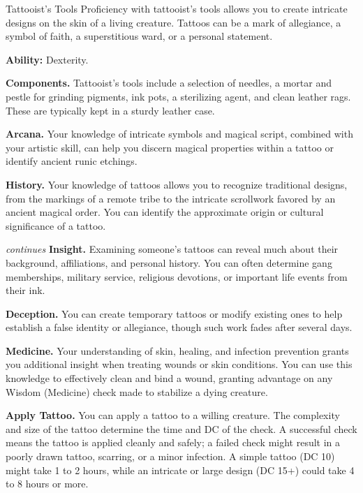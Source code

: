 \begin{Card}{Tattooist's Tools}
Proficiency with tattooist's tools allows you to create intricate designs on the skin of a living creature. Tattoos can be a mark of allegiance, a symbol of faith, a superstitious ward, or a personal statement.

\textbf{Ability:} Dexterity.

\textbf{Components.} Tattooist's tools include a selection of needles, a mortar and pestle for grinding pigments, ink pots, a sterilizing agent, and clean leather rags. These are typically kept in a sturdy leather case.

\textbf{Arcana.} Your knowledge of intricate symbols and magical script, combined with your artistic skill, can help you discern magical properties within a tattoo or identify ancient runic etchings.

\textbf{History.} Your knowledge of tattoos allows you to recognize traditional designs, from the markings of a remote tribe to the intricate scrollwork favored by an ancient magical order. You can identify the approximate origin or cultural significance of a tattoo.

\vfill \hfill \textit{\footnotesize continues}
\newpage
{}
\textbf{Insight.} Examining someone's tattoos can reveal much about their background, affiliations, and personal history. You can often determine gang memberships, military service, religious devotions, or important life events from their ink.

\textbf{Deception.} You can create temporary tattoos or modify existing ones to help establish a false identity or allegiance, though such work fades after several days.

\textbf{Medicine.} Your understanding of skin, healing, and infection prevention grants you additional insight when treating wounds or skin conditions. You can use this knowledge to effectively clean and bind a wound, granting advantage on any Wisdom (Medicine) check made to stabilize a dying creature.

\textbf{Apply Tattoo.} You can apply a tattoo to a willing creature. The complexity and size of the tattoo determine the time and DC of the check. A successful check means the tattoo is applied cleanly and safely; a failed check might result in a poorly drawn tattoo, scarring, or a minor infection. A simple tattoo (DC 10) might take 1 to 2 hours, while an intricate or large design (DC 15+) could take 4 to 8 hours or more.


\end{Card}
